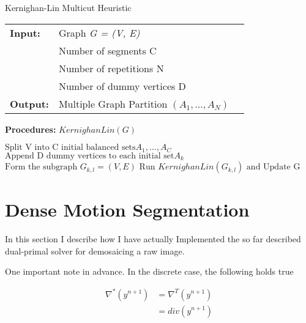\begin{algorithm}[H]
\caption{Kernighan-Lin Multicut Heuristic}
\begin{table}[H]
  \begin{tabular}{@{}lll@{}}
    \textbf{Input:} & Graph \emph{G = (V, E)} \\
        & Number of segments C \\
    & Number of repetitions N  \\
    & Number of dummy vertices D \\
	\textbf{Output:} & Multiple Graph Partition $\left( A_1,\dots, A_N \right)$ 
  \end{tabular} 
\end{table}
\textbf{Procedures:} $KernighanLin(G)$  \\
\setlength{\fboxrule}{0pt} 
\begin{boxedminipage}{1.0\textwidth}
  \begin{algorithmic}[1]
  	  \State $\text{Split V into C initial balanced sets} A_1,\dots,A_C$
  	  \State $\text{Append D dummy vertices to each initial set} A_k$ 
        \State $ \text{Form the subgraph } G_{k,l} = (V, E)$
		\State $\text{Run } KernighanLin(G_{k,l}) \text{ and Update G}$
      \EndFor
  \end{algorithmic}
  \end{boxedminipage}
  \vskip1.5pt
\label{alg:kl_multiple_segments}
\end{algorithm}  
  

\section{Dense Motion Segmentation}


In this section I describe how I have actually Implemented the so far described dual-primal solver for demosaicing a raw image.

One important note in advance. In the discrete case, the following holds true 

\begin{align}
	\nabla^* (y^{n+1}) 
	&= \nabla^{T} (y^{n+1}) \nonumber \\
	&= div(y^{n+1})
\end{align}

